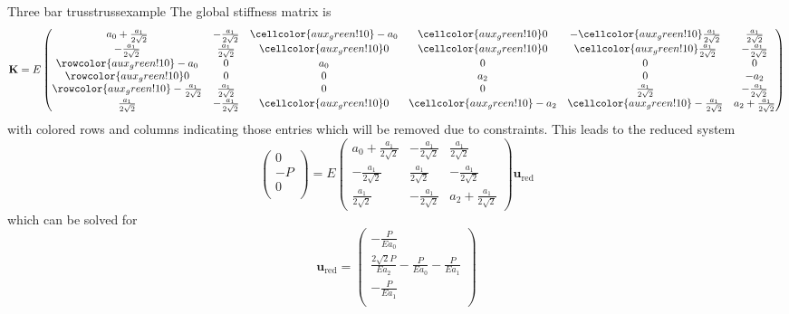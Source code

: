 \begin{example}{Three bar truss}{trussexample}
    The global stiffness matrix is 
    \begin{equation}
        \mathbf{K} = E
        \begin{pmatrix}
             a_0 + \frac{a_1}{2\sqrt{2}}&  -\frac{a_1}{2\sqrt{2}} & \cellcolor{aux_green!10}-a_0 &  \cellcolor{aux_green!10}0 & -\cellcolor{aux_green!10} \frac{a_1}{2\sqrt{2}} &  \frac{a_1}{2\sqrt{2}}\\
            -\frac{a_1}{2\sqrt{2}} &  \frac{a_1}{2\sqrt{2}} & \cellcolor{aux_green!10} 0 & \cellcolor{aux_green!10} 0 & \cellcolor{aux_green!10}\frac{a_1}{2\sqrt{2}} &  -\frac{a_1}{2\sqrt{2}} \\
            \rowcolor{aux_green!10}
             -a_0 &  0 & a_0 &  0 & 0 & 0\\
             \rowcolor{aux_green!10}
            0 &  0 & 0 &  a_2 & 0 &  -a_2 \\
            \rowcolor{aux_green!10}
             -\frac{a_1}{2\sqrt{2}} &  \frac{a_1}{2\sqrt{2}} & 0 &  0 & \frac{a_1}{2\sqrt{2}} &  -\frac{a_1}{2\sqrt{2}}\\
            \frac{a_1}{2\sqrt{2}} &  -\frac{a_1}{2\sqrt{2}} & \cellcolor{aux_green!10} 0 &  \cellcolor{aux_green!10} -a_2 & \cellcolor{aux_green!10} -\frac{a_1}{2\sqrt{2}} &  a_2 + \frac{a_1}{2\sqrt{2}}\\
        \end{pmatrix}
    \end{equation}
    with colored rows and columns indicating those entries which will be removed due to constraints. This leads to the reduced system 
    \begin{equation}
        \begin{pmatrix}
            0 \\ -P \\ 0  \\
        \end{pmatrix}
         = E
        \begin{pmatrix}
             a_0 + \frac{a_1}{2\sqrt{2}}&  -\frac{a_1}{2\sqrt{2}} &  \frac{a_1}{2\sqrt{2}}\\
            -\frac{a_1}{2\sqrt{2}} &  \frac{a_1}{2\sqrt{2}} &  -\frac{a_1}{2\sqrt{2}} \\
            \frac{a_1}{2\sqrt{2}} &  -\frac{a_1}{2\sqrt{2}} &  a_2 + \frac{a_1}{2\sqrt{2}}
        \end{pmatrix}
        \mathbf{u}_\textrm{red}
    \end{equation}
    which can be solved for 
    \begin{equation}
        \mathbf{u}_\textrm{red} = 
        \begin{pmatrix}
            -\frac{P}{Ea_0} \\  \frac{2\sqrt{2}P}{Ea_2} - \frac{P}{Ea_0} - \frac{P}{Ea_1} \\ -\frac{P}{Ea_1}  \\
        \end{pmatrix}
    \end{equation}


\end{example}

